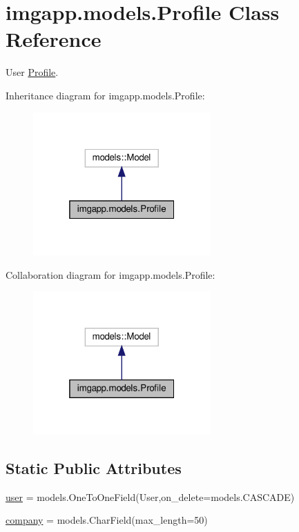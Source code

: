 \hypertarget{classimgapp_1_1models_1_1Profile}{}\section{imgapp.\+models.\+Profile Class Reference}
\label{classimgapp_1_1models_1_1Profile}


User \hyperlink{classimgapp_1_1models_1_1Profile}{Profile}.  




Inheritance diagram for imgapp.\+models.\+Profile\+:
\nopagebreak
\begin{figure}[H]
\begin{center}
\leavevmode
\includegraphics[width=193pt]{classimgapp_1_1models_1_1Profile__inherit__graph}
\end{center}
\end{figure}


Collaboration diagram for imgapp.\+models.\+Profile\+:
\nopagebreak
\begin{figure}[H]
\begin{center}
\leavevmode
\includegraphics[width=193pt]{classimgapp_1_1models_1_1Profile__coll__graph}
\end{center}
\end{figure}
\subsection*{Static Public Attributes}
\begin{DoxyCompactItemize}
\item 
\hyperlink{classimgapp_1_1models_1_1Profile_a42a93bae8e707591dbd2eea4f5f2cb28}{user} = models.\+One\+To\+One\+Field(User,on\+\_\+delete=models.\+C\+A\+S\+C\+A\+DE)
\item 
\hyperlink{classimgapp_1_1models_1_1Profile_a7204f3b8cc0278caf80fab184397f7ae}{company} = models.\+Char\+Field(max\+\_\+length=50)
\end{DoxyCompactItemize}


